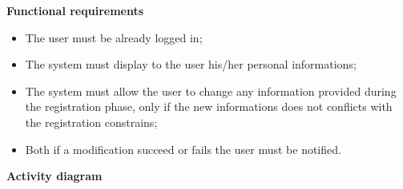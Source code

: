 \documentclass{article}
\begin{document}
	\bigskip
	\noindent
	\textbf{Functional requirements} \\
	\begin{itemize}
		\item The user must be already logged in;
		\item The system must display to the user his/her personal informations;
		\item The system must allow the user to change any information provided during the registration phase, only if the new informations does not conflicts with the registration constrains;
		\item Both if a modification succeed or fails the user must be notified.
	\end{itemize}
	
	\newpage
	\noindent
	\textbf{Activity diagram} \\
	
\end{document}
